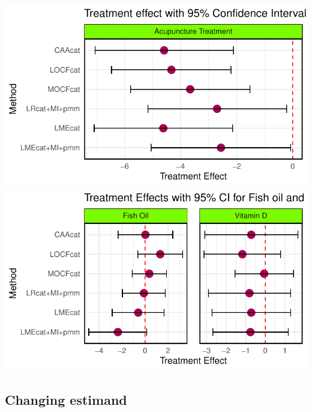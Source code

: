 \documentclass{article}
\newcommand{\pandocbounded}[1]{#1}
\begin{document}
\pandocbounded{\includegraphics[keepaspectratio]{Final_Report_files/figure-latex/unnamed-chunk-19-1.pdf}}
\pandocbounded{\includegraphics[keepaspectratio]{Final_Report_files/figure-latex/unnamed-chunk-19-2.pdf}}

\subsection{Changing estimand}\label{changing-estimand}
\end{document}
